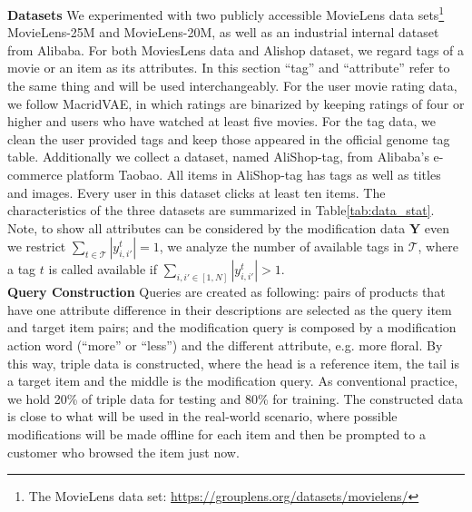 \textbf{Datasets} We experimented with two publicly accessible MovieLens data sets\footnote{The MovieLens data set: \url{https://grouplens.org/datasets/movielens/}} MovieLens-25M and MovieLens-20M, as well as an industrial internal dataset from Alibaba. For both MoviesLens data and Alishop dataset, we regard tags of a movie or an item as its attributes. In this section ``tag'' and ``attribute'' refer to the same thing and will be used interchangeably. For the user movie rating data, we follow MacridVAE, in which ratings are binarized by keeping ratings of four or higher and users who have watched at least five movies. For the tag data, we clean the user provided tags and keep those appeared in the official genome tag table. Additionally we collect a dataset, named AliShop-tag, from Alibaba's e-commerce platform Taobao.  All items in AliShop-tag has tags as well as titles and images. Every user in this dataset clicks at least ten items. The characteristics of the three datasets are summarized in Table\ref{tab:data_stat}. Note, to show all attributes can be considered by the modification data $\mathbf{Y}$ even we restrict $\sum_{t\in\mathcal{T}} |{y}^t_{i,i'}| = 1$, we analyze the number of available tags in $\mathcal{T}$, where a tag $t$ is called available if $\sum_{i,i' \in [1,N]} |{y}^t_{i,i'}| > 1$.\\
\textbf{Query Construction} Queries are created as following: pairs of products that have one attribute difference in their descriptions are selected as the query item and target item pairs; and the modification query is composed by a modification action word (``more'' or ``less'') and the different attribute, e.g. more floral. By this way, triple data is constructed, where the head is a reference item, the tail is a target item and the middle is the modification query. As conventional practice, we hold 20\% of triple data for testing and 80\% for training. The constructed data is close to what will be used in the real-world scenario, where possible modifications will be made offline for each item and then be prompted to a customer who browsed the item just now.


